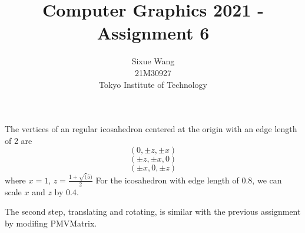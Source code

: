 \documentclass{article}
\title{Computer Graphics 2021 - Assignment 6}
\author{Sixue Wang\\21M30927\\Tokyo Institute of Technology}
\begin{document}
\maketitle

\section{}

The vertices of an regular icosahedron centered at the origin with an edge length of 2 are
\begin{equation*}
  (0,\pm z,\pm x)
\end{equation*}
\begin{equation*}
  (\pm z,\pm x,0)
\end{equation*}
\begin{equation*}
  (\pm x,0,\pm z)
\end{equation*}
where $x = 1$, $z = \frac{1+\sqrt(5)}{2}$
For the icosahedron with edge length of 0.8, we can scale $x$ and $z$ by $0.4$.

The second step, translating and rotating, is similar with the previous assignment by modifing PMVMatrix.
\end{document}
